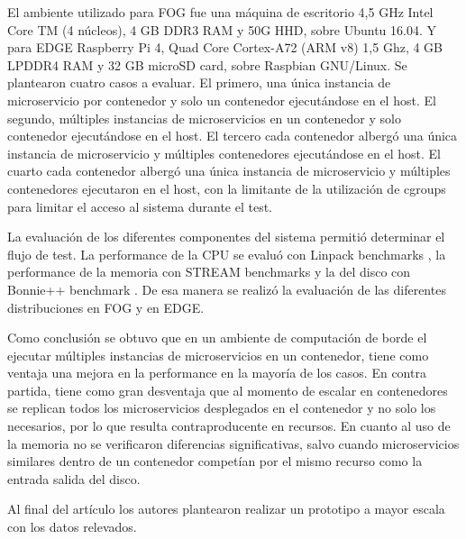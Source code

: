 El ambiente utilizado para FOG fue una máquina de escritorio 4,5 GHz Intel Core TM (4 núcleos),
4 GB DDR3 RAM y 50G HHD, sobre Ubuntu 16.04. Y para EDGE Raspberry Pi 4, Quad Core Cortex-A72 (ARM v8) 1,5 Ghz,
4 GB LPDDR4 RAM y 32 GB microSD card, sobre Raspbian GNU/Linux.
Se plantearon cuatro casos a evaluar. El primero, una única instancia de microservicio por contenedor y solo un contenedor ejecutándose en el host.
El segundo, múltiples instancias de microservicios en un contenedor y solo contenedor ejecutándose en el host. El tercero cada contenedor albergó una única instancia de microservicio y múltiples contenedores ejecutándose en el host. El cuarto cada contenedor albergó una única instancia de microservicio y múltiples contenedores ejecutaron en el host, con la limitante de la utilización de cgroups para limitar el acceso al sistema durante el test.\par

La evaluación de los diferentes componentes del sistema permitió determinar el flujo de test.
La performance de la CPU se evaluó con Linpack benchmarks
\cite{LINPACKBenchmarksWikipedia}, la performance de la memoria con STREAM benchmarks
\cite{STREAMBenchmarkAMD}
y la del disco con Bonnie++ benchmark \cite{BonnieWikipedia}.
De esa manera se realizó la evaluación de las diferentes distribuciones en FOG y en EDGE.\par

Como conclusión se obtuvo que en un ambiente de computación de borde el ejecutar múltiples instancias de microservicios en un contenedor,
tiene como ventaja una mejora en la performance en la mayoría de los casos.
En contra partida, tiene como gran desventaja que al momento de escalar en contenedores se replican todos los microservicios desplegados en el contenedor
y no solo los necesarios, por lo que resulta contraproducente en recursos.
En cuanto al uso de la memoria no se verificaron diferencias significativas,
salvo cuando microservicios similares dentro de un contenedor competían por el mismo recurso como la entrada salida del disco.\par

Al final del artículo los autores plantearon realizar un prototipo a mayor escala con los datos relevados.\par
